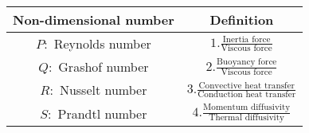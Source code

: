     \begin{tabular}{|c|c|}
        \hline
        \textbf{Non-dimensional number} &  \textbf{Definition} \\
        \hline
        $P\colon$  Reynolds number & $1.\frac{\text{Inertia force}}{\text{Viscous force}}$ \\
        \hline
        $Q\colon$ Grashof number & $2.\frac{\text{Buoyancy force}}{\text{Viscous force}}$ \\
        \hline
        $R\colon$ Nusselt number & $3.\frac{\text{Convective heat transfer}}{\text{Conduction heat transfer}}$ \\
        \hline
        $S\colon$ Prandtl number & $4.\frac{\text{Momentum diffusivity}}{\text{Thermal diffusivity}}$ \\
        \hline
    \end{tabular}

